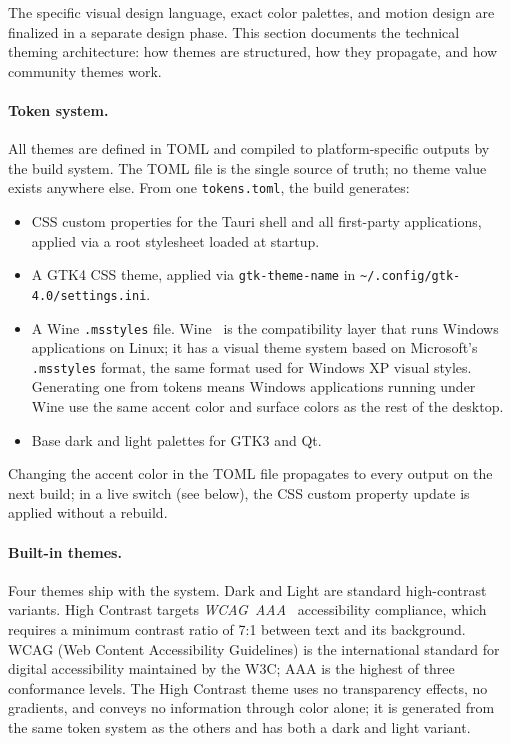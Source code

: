 The specific visual design language, exact color palettes, and motion design
are finalized in a separate design phase. This section documents the technical
theming architecture: how themes are structured, how they propagate, and how
community themes work.

\paragraph{Token system.}
All themes are defined in TOML and compiled to platform-specific outputs by
the build system. The TOML file is the single source of truth; no theme value
exists anywhere else. From one \texttt{tokens.toml}, the build generates:

\begin{itemize}
  \item CSS custom properties for the Tauri shell and all first-party
    applications, applied via a root stylesheet loaded at startup.
  \item A GTK4 CSS theme, applied via \texttt{gtk-theme-name} in
    \texttt{\textasciitilde/.config/gtk-4.0/settings.ini}.
  \item A Wine \texttt{.msstyles} file. Wine~\cite{archwiki:wine} is the
    compatibility layer that runs Windows applications on Linux; it has a
    visual theme system based on Microsoft's \texttt{.msstyles} format, the
    same format used for Windows XP visual styles. Generating one from tokens
    means Windows applications running under Wine use the same accent color and
    surface colors as the rest of the desktop.
  \item Base dark and light palettes for GTK3 and Qt.
\end{itemize}

Changing the accent color in the TOML file propagates to every output on the
next build; in a live switch (see below), the CSS custom property update is
applied without a rebuild.

\paragraph{Built-in themes.}
Four themes ship with the system. Dark and Light are standard high-contrast
variants. High Contrast targets
\emph{WCAG~AAA}~\cite{wcag} accessibility compliance, which requires a minimum
contrast ratio of 7:1 between text and its background. WCAG (Web Content
Accessibility Guidelines) is the international standard for digital
accessibility maintained by the W3C; AAA is the highest of three conformance
levels. The High Contrast theme uses no transparency effects, no gradients,
and conveys no information through color alone; it is generated from the same
token system as the others and has both a dark and light variant.

